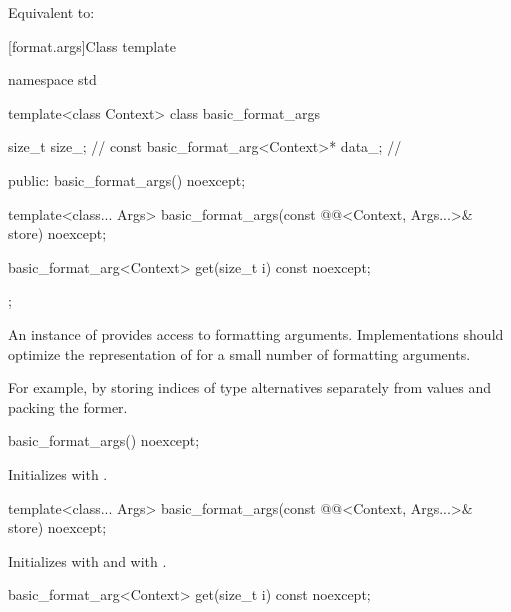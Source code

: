 \begin{itemdescr}
\pnum
\effects
Equivalent to:
\end{itemdescr}

[format.args]{Class template }

\begin{codeblock}
namespace std {
  template<class Context>
  class basic_format_args {
    size_t size_;                               // \expos
    const basic_format_arg<Context>* data_;     // \expos

  public:
    basic_format_args() noexcept;

    template<class... Args>
      basic_format_args(const @@<Context, Args...>& store) noexcept;

    basic_format_arg<Context> get(size_t i) const noexcept;
  };
}
\end{codeblock}

\pnum
An instance of  provides access to formatting
arguments.
Implementations should
optimize the representation of 
for a small number of formatting arguments.
\begin{note}
For example, by storing indices of type alternatives separately from values
and packing the former.
\end{note}

%
\begin{itemdecl}
basic_format_args() noexcept;
\end{itemdecl}

\begin{itemdescr}
\pnum
\effects
Initializes  with .
\end{itemdescr}

%
\begin{itemdecl}
template<class... Args>
  basic_format_args(const @@<Context, Args...>& store) noexcept;
\end{itemdecl}

\begin{itemdescr}
\pnum
\effects
Initializes
 with  and
 with .
\end{itemdescr}

%
\begin{itemdecl}
basic_format_arg<Context> get(size_t i) const noexcept;
\end{itemdecl}


